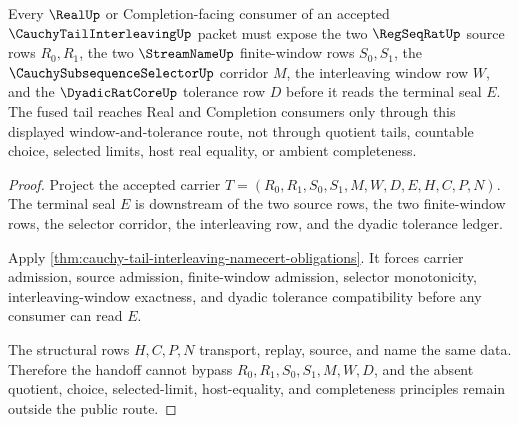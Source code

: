 \begin{theorem}
\label{thm:cauchy-tail-interleaving-real-seal-handoff}
Every $\RealUp$ or Completion-facing consumer of an accepted $\CauchyTailInterleavingUp$ packet must expose the two $\RegSeqRatUp$ source rows $R_0,R_1$, the two $\StreamNameUp$ finite-window rows $S_0,S_1$, the $\CauchySubsequenceSelectorUp$ corridor $M$, the interleaving window row $W$, and the $\DyadicRatCoreUp$ tolerance row $D$ before it reads the terminal seal $E$. The fused tail reaches Real and Completion consumers only through this displayed window-and-tolerance route, not through quotient tails, countable choice, selected limits, host real equality, or ambient completeness.
\end{theorem}
\begin{proof}
Project the accepted carrier $T=(R_0,R_1,S_0,S_1,M,W,D,E,H,C,P,N)$. The terminal seal $E$ is downstream of the two source rows, the two finite-window rows, the selector corridor, the interleaving row, and the dyadic tolerance ledger.

Apply \autoref{thm:cauchy-tail-interleaving-namecert-obligations}. It forces carrier admission, source admission, finite-window admission, selector monotonicity, interleaving-window exactness, and dyadic tolerance compatibility before any consumer can read $E$.

The structural rows $H,C,P,N$ transport, replay, source, and name the same data. Therefore the handoff cannot bypass $R_0,R_1,S_0,S_1,M,W,D$, and the absent quotient, choice, selected-limit, host-equality, and completeness principles remain outside the public route.
\end{proof}


\begin{closurestatus}{\CauchyTailInterleavingUp}
  \theoryclosure{\seedClosure}
  \formalstatus{\unformalizedV}
\end{closurestatus}
